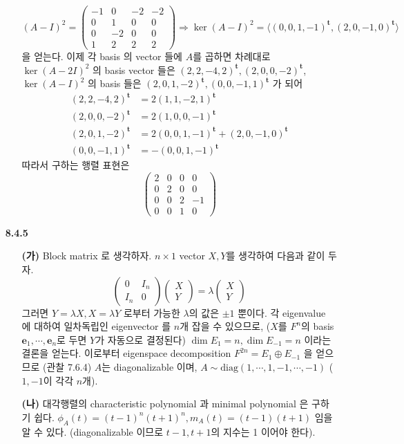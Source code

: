 \documentclass[12pt]{report}
\newcommand*{\trans}{^{\mathrm{\mathbf{t}}}}%
\begin{document}
\begin{itemize}
\begin{itemize}
		$$(A-I)^2=\begin{pmatrix}-1&0&-2&-2\\0&1&0&0\\0&-2&0&0\\1&2&2&2\end{pmatrix} \Rightarrow \ker(A-I)^2 = \langle(0, 0, 1, -1)\trans, (2, 0, -1, 0)\trans\rangle$$ 을 얻는다. 이제 각 basis 의 vector 들에 $A$를 곱하면 차례대로 $\ker(A-2I)^2$ 의 basis vector 들은 $(2, 2, -4, 2)\trans, (2, 0, 0, -2)\trans$, $\ker(A-I)^2$ 의 basis 들은 $(2, 0, 1, -2)\trans, (0, 0, -1, 1)\trans$ 가 되어 \\$$\begin{aligned}(2, 2, -4, 2)\trans &= 2(1, 1, -2, 1)\trans \\ (2, 0,0, -2)\trans &= 2(1, 0, 0, -1)\trans \\ (2, 0, 1, -2)\trans &= 2(0, 0, 1, -1)\trans + (2, 0, -1, 0)\trans \\(0, 0, -1, 1)\trans &= -(0, 0, 1, -1)\trans\end{aligned}$$ 따라서 구하는 행렬 표현은 $$\begin{pmatrix}2&0&0&0\\0&2&0&0\\0&0&2&-1\\0&0&1&0\end{pmatrix}$$
	\end{itemize}
	
\item[\textbf{8.4.5}]
	\begin{itemize}
		\item[\textbf{(가)}] Block matrix 로 생각하자. $n\times 1$ vector $X, Y$를 생각하여 다음과 같이 두자. $$\begin{pmatrix}0&I_n\\I_n&0\end{pmatrix}\begin{pmatrix}X\\Y\end{pmatrix} = \lambda \begin{pmatrix}X\\Y\end{pmatrix}$$ 그러면 $Y=\lambda X, X=\lambda Y$ 로부터 가능한 $\lambda$의 값은 $\pm 1$ 뿐이다. 각 eigenvalue 에 대하여 일차독립인 eigenvector 를 $n$개 잡을 수 있으므로, ($X$를 $F^n$의 basis $\mathrm{\mathbf{e}}_1, \cdots, \mathrm{\mathbf{e}}_n$로 두면 $Y$가 자동으로 결정된다) $\dim E_1 = n, \dim E_{-1} = n$ 이라는 결론을 얻는다. 이로부터 eigenspace decomposition $F^{2n}=E_1 \oplus E_{-1}$ 을 얻으므로 (관찰 7.6.4) $A$는 diagonalizable 이며, $A \sim \text{diag}(1, \cdots, 1, -1, \cdots, -1)$ ($1, -1$이 각각 $n$개).
		\item[\textbf{(나)}] 대각행렬의 characteristic polynomial 과 minimal polynomial 은 구하기 쉽다. $\phi_A(t) = (t-1)^n(t+1)^n, m_A(t) = (t-1)(t+1)$ 임을 알 수 있다. (diagonalizable 이므로 $t-1, t+1$의 지수는 1 이어야 한다).
	\end{itemize}
	

\end{itemize}
\end{document}
